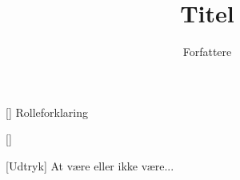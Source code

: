 \documentclass[a4paper,11pt]{article}
\title{Titel}
\author{Forfattere}
\begin{document}
\maketitle

\begin{roles}
[] Rolleforklaring
\end{roles}

\begin{props}
[]
\end{props}


\begin{sketch}


[Udtryk] At være eller ikke være... 



\end{sketch}
\end{document}
